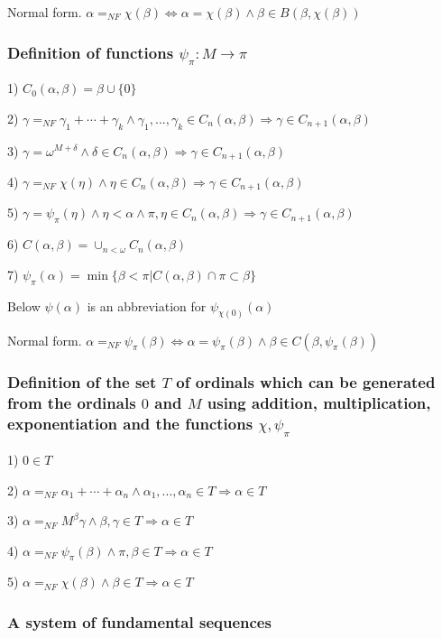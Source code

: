 \documentclass[10pt]{article}
\begin{document}
Normal form. \(\alpha=_{NF}\chi(\beta)\Leftrightarrow\alpha=\chi(\beta)\wedge\beta\in B(\beta,\chi(\beta))\)

\subsubsection{Definition of functions \(\psi_\pi:M\rightarrow \pi\)}

1) \(C_0(\alpha,\beta)=\beta\cup\{0\}\)

2) \(\gamma=_{NF}\gamma_1+\cdots+\gamma_k\wedge\gamma_1,...,\gamma_k \in C_n(\alpha,\beta)\Rightarrow\gamma\in C_{n+1}(\alpha,\beta)\)

3) \(\gamma=\omega^{M+\delta}\wedge\delta\in C_n(\alpha,\beta)\Rightarrow\gamma\in C_{n+1}(\alpha,\beta)\)

4) \(\gamma=_{NF}\chi(\eta)\wedge\eta\in C_n(\alpha,\beta) \Rightarrow\gamma\in C_{n+1}(\alpha,\beta)\)

5) \(\gamma=\psi_\pi(\eta)\wedge\eta<\alpha\wedge\pi,\eta\in C_n(\alpha,\beta)\Rightarrow\gamma\in C_{n+1}(\alpha,\beta)\)

6) \(C(\alpha,\beta)=\cup_{n<\omega}C_n(\alpha,\beta)\)

7) \(\psi_\pi(\alpha)=\min\{\beta<\pi|C(\alpha,\beta)\cap \pi\subset\beta\}\)

Below \(\psi(\alpha)\) is an abbreviation for \(\psi_{\chi(0)}(\alpha)\)

Normal form. \(\alpha=_{NF}\psi_\pi(\beta)\Leftrightarrow\alpha=\psi_\pi(\beta)\wedge\beta\in C(\beta,\psi_\pi(\beta))\)

\subsubsection{Definition of the set \(T\) of ordinals which can be generated from the ordinals \(0\) and \(M\) using addition, multiplication, exponentiation and the functions \(\chi,\psi_\pi\)}

1) \(0\in T\)

2) \(\alpha=_{NF}\alpha_1+\cdots+\alpha_n\wedge\alpha_1,...,\alpha_n\in T\Rightarrow\alpha\in T\)

3) \(\alpha=_{NF}M^\beta\gamma\wedge\beta,\gamma\in T\Rightarrow\alpha\in T\)

4) \(\alpha=_{NF}\psi_\pi(\beta)\wedge\pi,\beta\in T\Rightarrow\alpha\in T\)

5) \(\alpha=_{NF}\chi(\beta)\wedge\beta\in T\Rightarrow\alpha\in T\)

\subsubsection{A system of fundamental sequences}
\end{document}
